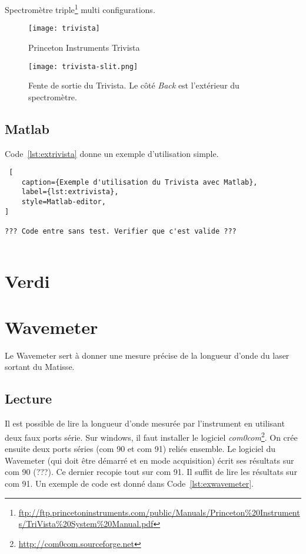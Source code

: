 \documentclass[11pt,francais]{book} %
\begin{document}
Spectromètre triple\footnote{\url{ftp://ftp.princetoninstruments.com/public/Manuals/Princeton\%20Instruments/TriVista\%20System\%20Manual.pdf}} multi configurations.

\begin{figure}[htbp]
\centering\texttt{[image: trivista]}
\caption{Princeton Instruments Trivista}
\label{fig:trivista}
\end{figure}

\begin{figure}[htbp]
\centering\texttt{[image: trivista-slit.png]}
\caption{Fente de sortie du Trivista. Le côté {\it Back} est l'extérieur du spectromètre.}
\label{fig:trivista-slit}
\end{figure}

\subsection{Matlab}

Code~\ref{lst:extrivista} donne un exemple d'utilisation simple.

\begin{lstlisting} [
    caption={Exemple d'utilisation du Trivista avec Matlab},
    label={lst:extrivista},
    style=Matlab-editor,
]

??? Code entre sans test. Verifier que c'est valide ???
  
\end{lstlisting}


\section{Verdi}


\section{Wavemeter}\label{wavemeter}

Le Wavemeter sert à donner une mesure précise de la longueur d'onde du laser sortant du Matisse.

\subsection{Lecture}
Il est possible de lire la longueur d'onde mesurée par l'instrument en utilisant deux faux ports série.
Sur windows, il faut installer le logiciel {\it com0com}\footnote{\url{http://com0com.sourceforge.net}}.
On crée ensuite deux ports séries (com 90 et com 91) reliés ensemble.
Le logiciel du Wavemeter (qui doit être démarré et en mode acquisition) écrit ses résultats sur com 90 (???).
Ce dernier recopie tout sur com 91.
Il suffit de lire les résultats sur com 91.
Un exemple de code est donné dans Code~\ref{lst:exwavemeter}.
\end{document}

